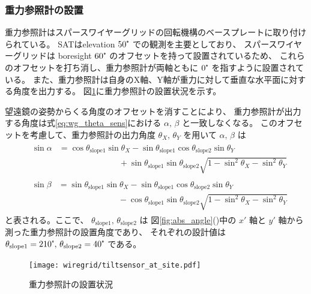 \documentclass[../../main.tex]{subfiles}
\begin{document}
\subsubsection{重力参照計の設置}
\label{subsubsec:wg_tiltsensor_slope}
重力参照計はスパースワイヤーグリッドの回転機構のベースプレートに取り付けられている。
SATはelevation $50\tcdegree$ での観測を主要としており、
スパースワイヤーグリッドは boresight $60\tcdegree$ のオフセットを持って設置されているため、
これらのオフセットを打ち消し、重力参照計が両軸ともに $0\tcdegree$ を指すように設置されている。
また、重力参照計は自身のX軸、Y軸が重力に対して垂直な水平面に対する角度を出力する。
図\ref{fig:tiltsensor_at_site}に重力参照計の設置状況を示す。

望遠鏡の姿勢からくる角度のオフセットを消すことにより、
重力参照計が出力する角度は式\eqref{eq:wg_theta_sens}における $\alpha,\,\beta$ と一致しなくなる。
このオフセットを考慮して、重力参照計の出力角度 $\theta_{X},\,\theta_{Y}$ を用いて $\alpha,\,\beta$ は
\begin{align}
    &\begin{split}
        \sin\alpha &= \cos\theta_{\mathrm{slope}1}\sin\theta_{X}-\sin\theta_{\mathrm{slope}1}\cos\theta_{\mathrm{slope}2}\sin\theta_{Y} \\
                   &\hspace{3cm} +\sin\theta_{\mathrm{slope}1}\sin\theta_{\mathrm{slope}2}\sqrt{1-\sin^2\theta_{X}-\sin^2\theta_{Y}}
    \end{split}
    \label{eq:wg_tiltsensor_slope1} \\
    &\begin{split}
        \sin\beta &= \sin\theta_{\mathrm{slope}1}\sin\theta_{X}-\sin\theta_{\mathrm{slope}1}\cos\theta_{\mathrm{slope}2}\sin\theta_{Y} \\
                  &\hspace{3cm}-\cos\theta_{\mathrm{slope}1}\sin\theta_{\mathrm{slope}2}\sqrt{1-\sin^2\theta_{X}-\sin^2\theta_{Y}}
    \end{split}
    \label{eq:wg_tiltsensor_slope2}
\end{align}
と表される。ここで、 $\theta_{\mathrm{slope}1},\,\theta_{\mathrm{slope}2}$ は
図\ref{fig:abs_angle}()中の $x'$ 軸と $y'$ 軸から測った重力参照計の設置角度であり、
それぞれの設計値は $\theta_{\mathrm{slope}1}=210\tcdegree,\,\theta_{\mathrm{slope}2}=40\tcdegree$ である。
\begin{figure}[H]
    \centering
    \texttt{[image: wiregrid/tiltsensor\_at\_site.pdf]}
    \caption{重力参照計の設置状況}
    \label{fig:tiltsensor_at_site}
\end{figure}
\end{document}
